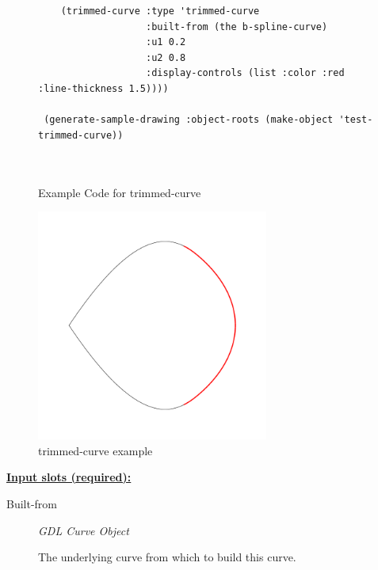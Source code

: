 \documentclass [11pt]{book}
\begin{document}
\begin{itemize}
\begin{figure}
\begin{lrbox}{\boxedverb}
\begin{minipage}{\linewidth}
{\begin{verbatim}
    (trimmed-curve :type 'trimmed-curve
                   :built-from (the b-spline-curve)
                   :u1 0.2
                   :u2 0.8
                   :display-controls (list :color :red :line-thickness 1.5))))

 (generate-sample-drawing :object-roots (make-object 'test-trimmed-curve))

   
\end{verbatim}}
\end{minipage}
\end{lrbox}
\fbox{\usebox{\boxedverb}}

\caption{Example Code for trimmed-curve}

\label{fig:example-code-trimmed-curve}

\end{figure}

\begin{figure}
\begin{center}
\includegraphics[width=3in,height=3in]{../images/example-trimmed-curve.pdf}
\end{center}

\caption{trimmed-curve example}

\label{fig:trimmed-curve}

\end{figure}





\textbf{
\underline{Input slots (required):}}

\begin{description}

\item [Built-from]
\emph{GDL Curve Object}

 The underlying curve from which to build this curve.





\end{description}
\end{itemize}
\end{document}
